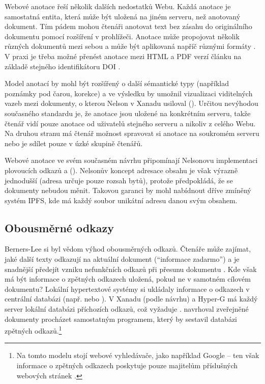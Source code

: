 Webové anotace řeší několik dalších nedostatků Webu.
Každá anotace je samostatná entita, která může být uložená na jiném serveru, než anotovaný dokument. Tím pádem mohou čtenáři anotovat text bez zásahu do originálního dokumentu pomocí rozšíření v prohlížeči.
Anotace může propojovat několik různých dokumentů mezi sebou a může být aplikovaná napříč různými formáty \autocite{Summers2013}.
V praxi je třeba možné přenést anotace mezi HTML a PDF verzí článku na základě stejného identifikátoru DOI \autocite{Hypo:DOI}.

Model anotací by mohl být rozšířený o další sémantické typy (například poznámky pod čarou, korekce) a ve výsledku by umožnil vizualizaci viditelných vazeb mezi dokumenty, o kterou Nelson v Xanadu usiloval (). Určitou nevýhodou současného standardu je, že anotace jsou uložené na konkrétním serveru, takže čtenář vidí pouze anotace od uživatelů stejného serveru a nikoliv z celého Webu. Na druhou stranu má čtenář možnost spravovat si anotace na soukromém serveru nebo je sdílet pouze v úzké skupině čtenářů.

\label{p:xw:links:xanalinks}
Webové anotace ve svém současném návrhu připomínají Nelsonovu implementaci plovoucích odkazů a  (). Nelsonův koncept adresace obsahu je však výrazně jednodušší (adresa určuje pouze rozsah bytů), protože předpokládá, že se dokumenty nebudou měnit. Takovou garanci by mohl nabídnout dříve zmíněný systém IPFS, kde má každý soubor unikátní adresu danou svým obsahem.

\subsection{Obousměrné odkazy}

Berners-Lee si byl vědom výhod obousměrných odkazů. Čtenáře může zajímat, jaké další texty odkazují na aktuální dokument (\enquote{informace zadarmo}) a je snadnější předejít vzniku nefunkčních odkazů při přesunu dokumentu \autocite{HT:Topology}. Kde však má být informace o zpětných odkazech uložená, pokud ne v samotném cílovém dokumentu? Lokální hypertextové systémy si ukládaly informace o odkazech v centrální databázi (např.  nebo ). V Xanadu (podle návrhu) a Hyper-G má každý server lokální databázi příchozích odkazů, což vyžaduje . \Textcite{HT:Topology} navrhoval zveřejněné dokumenty procházet samostatným programem, který by sestavil databázi zpětných odkazů.\footnote{Na tomto modelu stojí webové vyhledávače, jako například Google -- ten však informace o zpětných odkazech poskytuje pouze majitelům příslušných webových stránek \autocite{Cutts2007}.}

